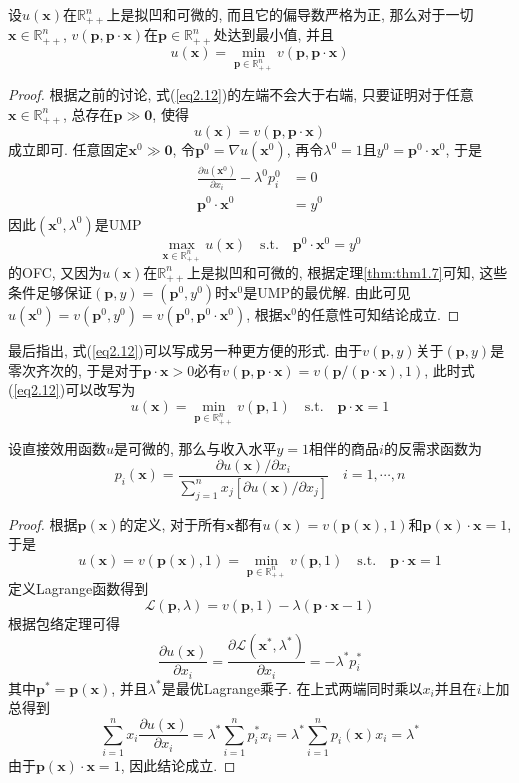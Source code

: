 \documentclass[cn, 12pt, math=mtpro2, bibstyle=apa, blue]{elegantbook}
\newcommand{\R}{\mathbb{R}}
\newcommand{\p}{\mathbf{p}}
\newcommand{\x}{\mathbf{x}}
\begin{document}
\begin{theorem}
  设$u(\x)$在$\R_{++}^n$上是拟凹和可微的, 而且它的偏导数严格为正, 那么对于一切$\x\in\R_{++}^n$, $v(\p,\p\cdot\x)$在$\p\in\R_{++}^n$处达到最小值, 并且
  \begin{equation}\label{eq2.12}
    u(\x)=\min_{\p\in\R_{++}^n}v(\p,\p\cdot\x)
  \end{equation}
\end{theorem}
\begin{proof}
  根据之前的讨论, 式(\ref{eq2.12})的左端不会大于右端, 只要证明对于任意$\x\in\R_{++}^n$, 总存在$\p\gg\mathbf{0}$, 使得
  \begin{equation}\label{eq2.13}
    u(\x)=v(\p,\p\cdot\x)
  \end{equation}
  成立即可. 任意固定$\x^0\gg\mathbf{0}$, 令$\p^0=\nabla u(\x^0)$, 再令$\lambda^0=1$且$y^0=\p^0\cdot\x^0$, 于是
  \begin{align*}
  \frac{\partial u(\x^0)}{\partial x_i}-\lambda^0p_i^0&=0 \\
  \p^0\cdot\x^0&=y^0
  \end{align*}
  因此$(\x^0,\lambda^0)$是UMP
  $$\max_{\x\in\R_{++}^n}u(\x)\quad\text{s.t.}\quad\p^0\cdot\x^0=y^0$$
  的OFC, 又因为$u(\x)$在$\R_{++}^n$上是拟凹和可微的, 根据定理\ref{thm:thm1.7}可知, 这些条件足够保证$(\p,y)=(\p^0,y^0)$时$\x^0$是UMP的最优解. 由此可见$u(\x^0)=v(\p^0,y^0)=v(\p^0,\p^0\cdot\x^0)$, 根据$\x^0$的任意性可知结论成立.
\end{proof}

最后指出, 式(\ref{eq2.12})可以写成另一种更方便的形式. 由于$v(\p,y)$关于$(\p,y)$是零次齐次的, 于是对于$\p\cdot\x>0$必有$v(\p,\p\cdot\x)=v(\p/(\p\cdot\x),1)$, 此时式(\ref{eq2.12})可以改写为
\begin{equation}\label{eq2.14}
  u(\x)=\min_{\p\in\R_{++}^n}v(\p,1)\quad\text{s.t.}\quad\p\cdot\x=1
\end{equation}
\begin{theorem}
  设直接效用函数$u$是可微的, 那么与收入水平$y=1$相伴的商品$i$的反需求函数为
  $$p_i(\x)=\frac{\partial u(\x)/\partial x_i}{\sum_{j=1}^{n}x_j[\partial u(\x)/\partial x_j]}\quad i=1,\cdots,n$$
\end{theorem}
\begin{proof}
  根据$\p(\x)$的定义, 对于所有$\x$都有$u(\x)=v(\p(\x),1)$和$\p(\x)\cdot\x=1$, 于是
  \begin{equation}\label{eq2.15}
    u(\x)=v(\p(\x),1)=\min_{\p\in\R_{++}^n}v(\p,1)\quad\text{s.t.}\quad\p\cdot\x=1
  \end{equation}
  定义Lagrange函数得到
  $$\mathcal{L}(\p,\lambda)=v(\p,1)-\lambda(\p\cdot\x-1)$$
  根据包络定理可得
  $$\frac{\partial u(\x)}{\partial x_i}=\frac{\partial\mathcal{L}(\x^\ast,\lambda^\ast)}{\partial x_i}=-\lambda^\ast p_i^\ast$$
  其中$\p^\ast=\p(\x)$, 并且$\lambda^\ast$是最优Lagrange乘子. 在上式两端同时乘以$x_i$并且在$i$上加总得到
  $$\sum_{i=1}^{n}x_i\frac{\partial u(\x)}{\partial x_i}=\lambda^\ast\sum_{i=1}^{n}p_i^\ast x_i=\lambda^\ast\sum_{i=1}^{n}p_i(\x)x_i=\lambda^\ast$$
  由于$\p(\x)\cdot\x=1$, 因此结论成立.
\end{proof}
\end{document}
